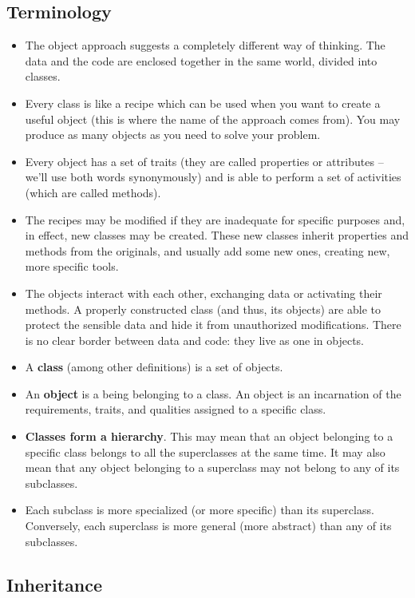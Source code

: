 \documentclass[11pt]{article}
\begin{document}
\subsection{Terminology}
\label{sec:orgd6ce4e8}
\begin{itemize}
\item The object approach suggests a completely different way of
thinking. The data and the code are enclosed together in the same
world, divided into classes.
\item Every class is like a recipe which can be used when you want to
create a useful object (this is where the name of the approach comes
from). You may produce as many objects as you need to solve your
problem.
\item Every object has a set of traits (they are called properties or
attributes – we’ll use both words synonymously) and is able to
perform a set of activities (which are called methods).
\item The recipes may be modified if they are inadequate for specific
purposes and, in effect, new classes may be created. These new
classes inherit properties and methods from the originals, and
usually add some new ones, creating new, more specific tools.
\item The objects interact with each other, exchanging data or activating
their methods. A properly constructed class (and thus, its objects)
are able to protect the sensible data and hide it from unauthorized
modifications. There is no clear border between data and code: they
live as one in objects.
\item A \textbf{class} (among other definitions) is a set of objects.
\item An \textbf{object} is a being belonging to a class. An object is an
incarnation of the requirements, traits, and qualities assigned to a
specific class.
\item \textbf{Classes form a hierarchy}. This may mean that an object belonging to
a specific class belongs to all the superclasses at the same
time. It may also mean that any object belonging to a superclass may
not belong to any of its subclasses.
\item Each subclass is more specialized (or more specific) than its
superclass. Conversely, each superclass is more general (more
abstract) than any of its subclasses.
\end{itemize}

\newpage

\subsection{Inheritance}
\label{sec:org8f2d43b}
\end{document}
